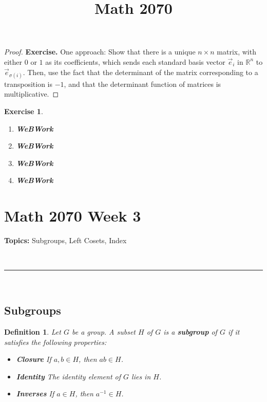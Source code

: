 \documentclass[a4paper,12pt]{report}
\newcounter{statement}
\numberwithin{statement}{chapter}
\newtheorem{defn}[statement]{Definition}
\newtheorem{ex}[statement]{\bf Exercise}
\numberwithin{equation}{chapter}
\numberwithin{section}{chapter}
\numberwithin{subsection}{section}
\begin{document}
\begin{proof}

 {\bf Exercise.} 
One approach: Show that there is a unique $n \times n$ matrix, with either $0$ or $1$ as its coefficients,
which sends each standard basis vector $\vec{e}_i$ in $\mathbb{R}^n$ to $\vec{e}_{\sigma(i)}$.
Then, use the fact that the determinant of the matrix corresponding to a transposition is $-1$,
and that the determinant function of matrices is multiplicative.
\end{proof}

\begin{ex}
\begin{enumerate}
\item  
{\bf WeBWork}

\item  
{\bf WeBWork}

\item  
{\bf WeBWork}

\item  
{\bf WeBWork}
\end{enumerate}\end{ex}\title{Math 2070}
\setcounter{chapter}{3}\setcounter{section}{0}
\setcounter{subsection}{0}
\setcounter{statement}{0}

\chapter*{Math 2070 Week 3}
{\bf Topics: }Subgroups, Left Cosets, Index




\quad\\\hrule
\quad\\
\section*{Subgroups}

\begin{defn}
Let $G$ be a group.
A subset $H$ of $G$ is a  {\bf subgroup}  of $G$ if it satisfies the following properties:




\begin{itemize}
\item 
 {\bf Closure}  If $a, b \in H$, then $ab \in H$.

\item 
 {\bf Identity}  The identity element of $G$ lies in $H$.

\item 
 {\bf Inverses}  If $a \in H$, then $a^{-1} \in H$.
\end{itemize}

\end{defn}
\end{document}
